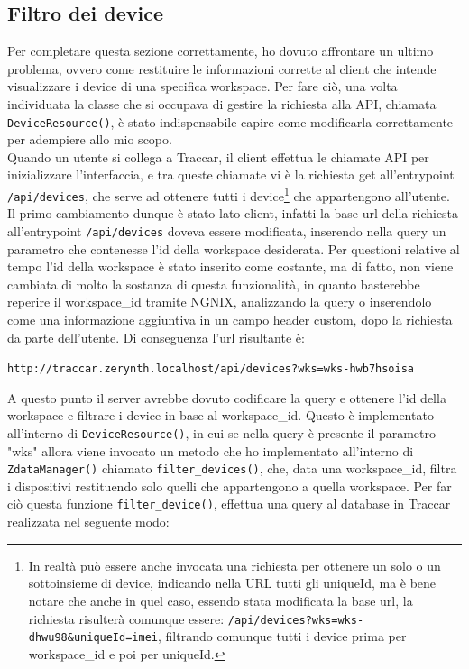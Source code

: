 \documentclass[a4paper,titlepage,12pt]{report}
\begin{document}
{\subsection{ 
Filtro dei device}
Per completare questa sezione correttamente, ho dovuto affrontare un ultimo problema, ovvero come restituire le informazioni corrette al client che intende visualizzare i device di una specifica workspace. Per fare ciò, una volta individuata la classe che si occupava di gestire la richiesta alla API, chiamata \texttt{DeviceResource()}, è stato indispensabile capire come modificarla correttamente per adempiere allo mio scopo.\\
Quando un utente si collega a Traccar, il client effettua le chiamate API per inizializzare l'interfaccia, e tra queste chiamate vi è la richiesta get all'entrypoint \texttt{/api/devices}, che serve ad ottenere tutti i device\footnote{In realtà può essere anche invocata una richiesta per ottenere un solo o un sottoinsieme di device, indicando nella URL tutti gli uniqueId, ma è bene notare che anche in quel caso, essendo stata modificata la base url, la richiesta risulterà comunque essere: \texttt{/api/devices?wks=wks-dhwu98\&uniqueId=imei}, filtrando comunque tutti i device prima per workspace\_id e poi per uniqueId.} che appartengono all'utente.\\
Il primo cambiamento dunque è stato lato client, infatti la base url della richiesta all'entrypoint \texttt{/api/devices} doveva essere modificata, inserendo nella query un parametro che contenesse l'id della workspace desiderata. Per questioni relative al tempo l'id della workspace è stato inserito come costante, ma di fatto, non viene cambiata di molto la sostanza di questa funzionalità, in quanto basterebbe reperire il workspace\_id tramite NGNIX, analizzando la query o inserendolo come una informazione aggiuntiva in un campo header custom, dopo la richiesta da parte dell'utente. Di conseguenza l'url risultante è:\par\medskip
\texttt{http://traccar.zerynth.localhost/api/devices?wks=wks-hwb7hsoisa}\par\medskip

A questo punto il server avrebbe dovuto codificare la query e ottenere l'id della workspace e filtrare i device in base al workspace\_id. Questo è implementato all'interno di \texttt{DeviceResource()}, in cui se nella query è presente il parametro "wks" allora viene invocato un metodo che ho implementato all'interno di \texttt{ZdataManager()} chiamato \texttt{filter\_devices()}, che, data una workspace\_id, filtra i dispositivi restituendo solo quelli che appartengono a quella workspace. Per far ciò questa funzione \texttt{filter\_device()}, effettua una query al database in Traccar realizzata nel seguente modo:

}
\end{document}
